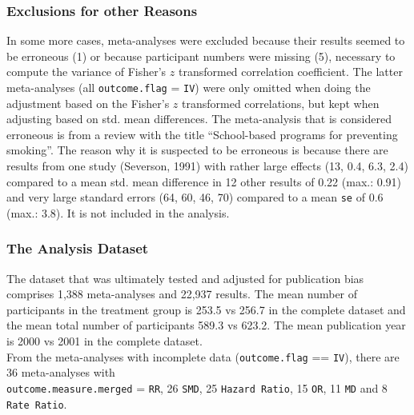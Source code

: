 \documentclass[11pt,a4paper,twoside]{book}\usepackage[]{graphicx}\usepackage[]{color}
\begin{document}
\subsubsection{Exclusions for other Reasons}
In some more cases, meta-analyses were excluded because their results seemed to be erroneous (1) or because participant numbers were missing (5), necessary to compute the variance of Fisher's $z$ transformed correlation coefficient. The latter meta-analyses (all \texttt{outcome.flag} = \texttt{IV}) were only omitted when doing the adjustment based on the Fisher's $z$ transformed correlations, but kept when adjusting based on std. mean differences. The meta-analysis that is considered erroneous is from a review with the title ``School-based programs for preventing smoking''. The reason why it is suspected to be erroneous is because there are results from one study (Severson, 1991) with rather large effects (13, 0.4, 6.3, 2.4) compared to a mean std. mean difference in 12 other results of 0.22 (max.: 0.91) and very large standard errors (64, 60, 46, 70) compared to a mean \texttt{se} of 0.6 (max.: 3.8). It is not included in the analysis.

\subsubsection{The Analysis Dataset}
The dataset that was ultimately tested and adjusted for publication bias comprises 1,388 meta-analyses and 22,937 results. The mean number of participants in the treatment group is 253.5 vs 256.7 in the complete dataset and the mean total number of participants 589.3 vs 623.2. The mean publication year is 2000 vs 2001 in the complete dataset. \\
From the meta-analyses with incomplete data (\texttt{outcome.flag} == \texttt{IV}), there are 36 meta-analyses with \\ \texttt{outcome.measure.merged} = \texttt{RR}, 26 \texttt{SMD},  25 \texttt{Hazard Ratio}, 15 \texttt{OR}, 11 \texttt{MD} and 8 \texttt{Rate Ratio}.
\end{document}
